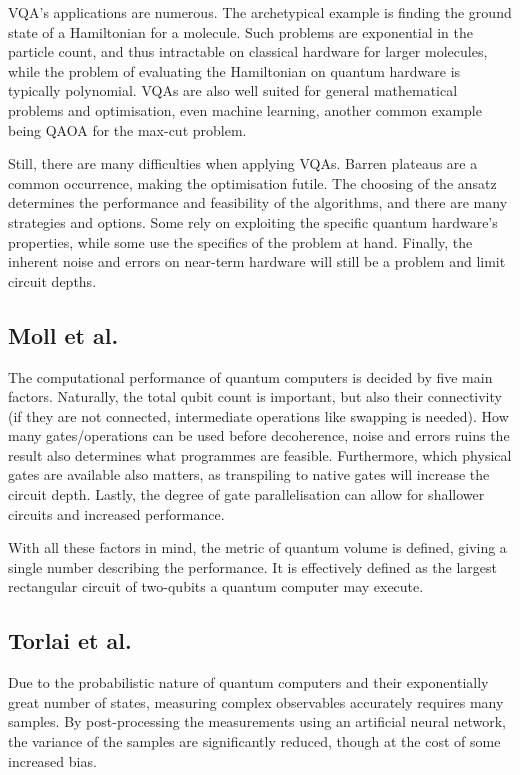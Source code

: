 VQA's applications are numerous. The archetypical example is finding the ground state of a Hamiltonian for a molecule. Such problems are exponential in the particle count, and thus intractable on classical hardware for larger molecules, while the problem of evaluating the Hamiltonian on quantum hardware is typically polynomial. VQAs are also well suited for general mathematical problems and optimisation, even machine learning, another common example being QAOA for the max-cut problem.


Still, there are many difficulties when applying VQAs. Barren plateaus are a common occurrence, making the optimisation futile. The choosing of the ansatz determines the performance and feasibility of the algorithms, and there are many strategies and options. Some rely on exploiting the specific quantum hardware's properties, while some use the specifics of the problem at hand. Finally, the inherent noise and errors on near-term hardware will still be a problem and limit circuit depths.


\subsection{Moll et al.}
The computational performance of quantum computers is decided by five main factors. Naturally, the total qubit count is important, but also their connectivity (if they are not connected, intermediate operations like swapping is needed). How many gates/operations can be used before decoherence, noise and errors ruins the result also determines what programmes are feasible. Furthermore, which physical gates are available also matters, as transpiling to native gates will increase the circuit depth. Lastly, the degree of gate parallelisation can allow for shallower circuits and increased performance.

With all these factors in mind, the metric of quantum volume is defined, giving a single number describing the performance. It is effectively defined as the largest rectangular circuit of two-qubits a quantum computer may execute.

\subsection*{Torlai et al.}
Due to the probabilistic nature of quantum computers and their exponentially great number of states, measuring complex observables accurately requires  many samples. By post-processing the measurements using an artificial neural network, the variance of the samples are significantly reduced, though at the cost of some increased bias.

